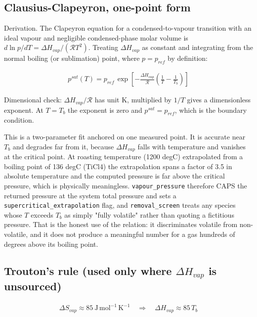 \documentclass[10pt,a4paper,twoside]{report}
\begin{document}
\subsection*{Clausius-Clapeyron, one-point form}

Derivation. The Clapeyron equation for a condensed-to-vapour transition with an ideal vapour and negligible condensed-phase molar volume is $d\ln p/dT = \Delta H_{vap}/(\mathcal{R}T^2)$. Treating $\Delta H_{vap}$ as constant and integrating from the normal boiling (or sublimation) point, where $p = p_{ref}$ by definition:

\begin{equation*}
\begin{gathered}
\boxed{p^{sat}(T) = p_{ref}\,\exp\!\left[-\frac{\Delta H_{vap}} {\mathcal{R}}\left(\frac{1}{T}-\frac{1}{T_b}\right)\right]}
\end{gathered}
\end{equation*}

Dimensional check: $\Delta H_{vap}/\mathcal{R}$ has unit K, multiplied by $1/T$ gives a dimensionless exponent. At $T = T_b$ the exponent is zero and $p^{sat} = p_{ref}$, which is the boundary condition.

This is a two-parameter fit anchored on one measured point. It is accurate near $T_b$ and degrades far from it, because $\Delta H_{vap}$ falls with temperature and vanishes at the critical point. At roasting temperature (1200 degC) extrapolated from a boiling point of 136 degC (TiCl4) the extrapolation spans a factor of 3.5 in absolute temperature and the computed pressure is far above the critical pressure, which is physically meaningless. \texttt{vapour\_pressure} therefore CAPS the returned pressure at the system total pressure and sets a \texttt{supercritical\_extrapolation} flag, and \texttt{removal\_screen} treats any species whose $T$ exceeds $T_b$ as simply "fully volatile" rather than quoting a fictitious pressure. That is the honest use of the relation: it discriminates volatile from non-volatile, and it does not produce a meaningful number for a gas hundreds of degrees above its boiling point.

\subsection*{Trouton's rule (used only where $\Delta H_{vap}$ is unsourced)}

\begin{equation*}
\begin{gathered}
\Delta S_{vap} \approx 85\ \mathrm{J\,mol^{-1}\,K^{-1}} \quad\Rightarrow\quad \Delta H_{vap} \approx 85\,T_b
\end{gathered}
\end{equation*}
\end{document}
